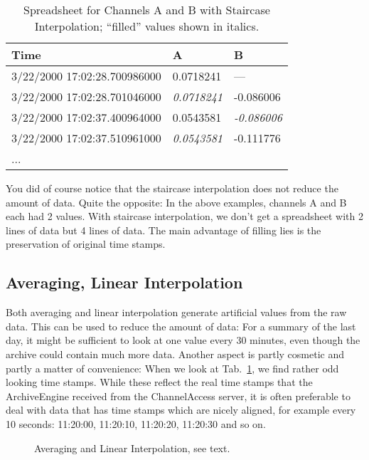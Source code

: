 \begin{table}[htbp]
  \begin{center}
    \sffamily
    \begin{tabular}[t]{l|l|l}
      Time                         & A         & B         \\
      \hline
      3/22/2000 17:02:28.700986000 & 0.0718241 & ---       \\
      3/22/2000 17:02:28.701046000 & \textit{0.0718241}      & -0.086006 \\
      3/22/2000 17:02:37.400964000 & 0.0543581 & \textit{-0.086006} \\
      3/22/2000 17:02:37.510961000 & \textit{0.0543581} & -0.111776 \\
      ...
    \end{tabular}
    \caption{Spreadsheet for Channels A and B with Staircase
      Interpolation; ``filled'' values shown in italics.}
    \label{tab:ABstair}
  \end{center}
\end{table}

You did of course notice that the staircase interpolation does not
reduce the amount of data. Quite the opposite: In the above examples,
channels A and B each had 2 values. With staircase interpolation, we
don't get a spreadsheet with 2 lines of data but 4 lines of data.  The
main advantage of filling lies is the preservation of original time stamps.

\subsection{Averaging, Linear Interpolation}  \label{sec:lininterpol}
Both averaging and linear interpolation generate artificial values from the raw
data. This can be used to reduce the amount of data: For a summary of
the last day, it might be sufficient to look at one value every 30
minutes, even though the archive could contain much more data.
Another aspect is partly cosmetic and partly a matter of convenience:
When we look at Tab.~\ref{tab:ABstair}, we find rather odd looking
time stamps. While these reflect the real time stamps that the
ArchiveEngine received from the ChannelAccess server, it is often
preferable to deal with data that has time stamps which are nicely
aligned, for example every 10 seconds: 11:20:00, 11:20:10, 11:20:20,
11:20:30 and so on.

\begin{figure}[htb]
\begin{center}
\medskip
{}
\end{center}
\caption{\label{fig:interpol}Averaging and Linear Interpolation, see text.}
\end{figure}

